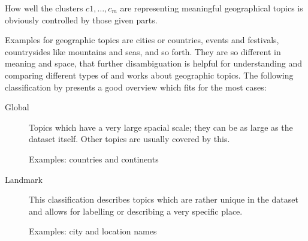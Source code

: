 \vspace{.5em}
\noindent
How well the clusters ${c1, \dots, c_m}$ are representing meaningful geographical topics is obviously controlled by those given parts.

Examples for geographic topics are cities or countries, events and festivals, countrysides like mountains and seas, and so forth. They are so different in meaning and space, that further disambiguation is helpful for understanding and comparing different types of and works about geographic topics. The following classification by \cite{Sengstock2011, Sengstock2012a} presents a good overview which fits for the most cases:
\begin{description}
\item[Global] Topics which have a very large spacial scale; they can be as large as the dataset itself. Other topics are usually covered by this.

Examples: countries and continents

\item[Landmark] This classification describes topics which are rather unique in the dataset and allows for labelling or describing a very specific place.

Examples: city and location names


\end{description}
